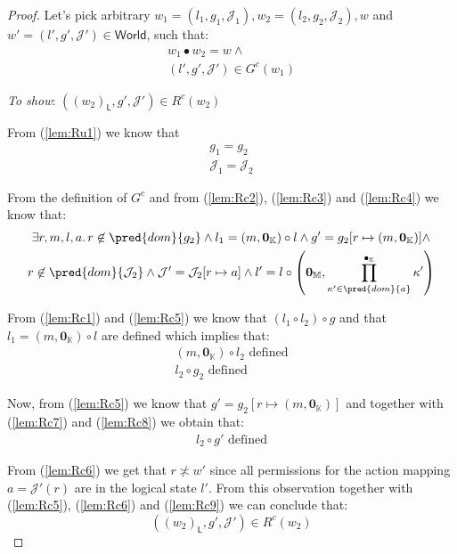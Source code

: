 {\parindent0pt
\begin{proof}
Let's pick arbitrary $w_1 = (l_1, g_1, \mathcal{J}_1), w_2 = (l_2, g_2, \mathcal{J}_2), w$ and $w' = (l', g', \mathcal{J}') \in \mathsf{World}$, such that:
\begin{gather}
	\label{lem:Rc1} w_1 \bullet w_2 = w \land \\
	\label{lem:Rc2} (l', g', \mathcal{J}') \in G^c(w_1)
\end{gather}

\textit{To show}: $((w_2)_\mathsf{L}, g', \mathcal{J}') \in R^c(w_2)$

From (\ref{lem:Ru1}) we know that
\begin{gather}
	\label{lem:Rc3} g_1 = g_2 \\
	\label{lem:Rc4} \mathcal{J}_1 = \mathcal{J}_2
\end{gather}

From the definition of $G^c$ and from (\ref{lem:Rc2}), (\ref{lem:Rc3}) and (\ref{lem:Rc4}) we know that:
\begin{gather}
	\label{lem:Rc5} \exists r, m, l, a \ldotp r \not\in \pred{dom}{g_2} \land l_1 = (m, \mathbf{0}_\mathbb{K}) \circ l \land g' = g_2[r \mapsto (m, \mathbf{0}_\mathbb{K})] \land
	\\
	\label{lem:Rc6} r \not\in \pred{dom}{\mathcal{J}_2} \land \mathcal{J}' = \mathcal{J}_2[r \mapsto a] \land l' = l \circ \left( \mathbf{0}_\mathbb{M}, \prod^{\bullet_\mathbb{K}}_{\kappa' \in \pred{dom}{a}} \kappa' \right)
\end{gather}

From (\ref{lem:Rc1}) and (\ref{lem:Rc5}) we know that $(l_1 \circ l_2) \circ g$ and that $l_1 = (m, \mathbf{0}_\mathbb{K}) \circ l$ are defined which implies that:
\begin{gather}
	\label{lem:Rc7} (m, \mathbf{0}_\mathbb{K}) \circ l_2 \text{ defined}
	\\
	\label{lem:Rc8} l_2 \circ g_2 \text{ defined}
\end{gather}

Now, from (\ref{lem:Rc5}) we know that $g' = g_2[r \mapsto (m, \mathbf{0}_\mathbb{K})]$ and together with (\ref{lem:Rc7}) and (\ref{lem:Rc8}) we obtain that:
\begin{gather}
	\label{lem:Rc9} l_2 \circ g' \text{ defined}
\end{gather}

From (\ref{lem:Rc6}) we get that $r \not\asymp w'$ since all permissions for the action mapping $a = \mathcal{J}'(r)$ are in the logical state $l'$. From this observation together with (\ref{lem:Rc5}), (\ref{lem:Rc6}) and (\ref{lem:Rc9}) we can conclude that:
\[
	((w_2)_\mathsf{L}, g', \mathcal{J}') \in R^c(w_2)
\]
\end{proof}
}